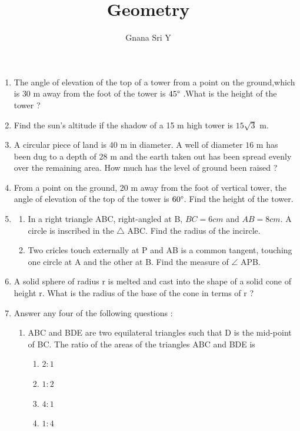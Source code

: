 \documentclass[11pt]{article}
\begin{document}
\title{Geometry}
\author{Gnana Sri  Y}
\maketitle

\begin{enumerate}
	\item The angle of elevation of the top of a tower from a point on the ground,which is $30$ m away from the foot of the tower is $45\degree$ .What is the height of the tower ?
	\item Find the sun's altitude if the shadow of a 15 m high tower is ${15}\sqrt{3}$ m.
	\item A circular piece of land is $40$ m in diameter. A well of diameter $16$ m has been dug to a depth of $28$ m and the earth taken out has been spread evenly over the remaining area. How much has the level of ground been raised ?
	\item From a point on the ground, $20$ m away from the foot of vertical tower, the angle of elevation of the top of the tower is $60\degree$. Find the height of the tower.
	\item
	\begin{enumerate}
		\item In a right triangle ABC, right-angled at B, $BC= 6 cm$ and $AB = 8 cm$. A circle is inscribed in the {$\triangle$} ABC. Find the radius of the incircle.
		\item Two cricles touch externally at P and AB is a common tangent, touching one circle at A and the other at B. Find the measure of $\angle$ APB.
	\end{enumerate}
	\item A solid sphere of radius r is melted and cast into the shape of a solid cone of height r. What is the radius of the base of the cone in terms of r ?
	\item Answer any four of the following questions :
		\begin{enumerate}[label=(\roman*)]
			\item ABC and BDE are two equilateral triangles such that D is the mid-point of BC. The ratio of the areas of the triangles ABC and BDE is
				\begin{enumerate}[label=(\Alph*)]
					\item $2 : 1$
					\item $1 : 2$
					\item $4 : 1$
					\item $1 : 4$
				\end{enumerate}

\end{enumerate}
\end{enumerate}
\end{document}
